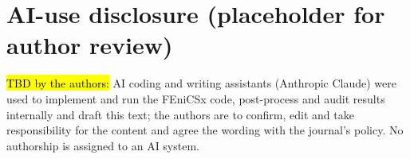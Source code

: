 \documentclass[sn-mathphys,Numbered]{sn-jnl}
\begin{document}
\section*{AI-use disclosure (placeholder for author review)}
{\small\hl{TBD by the authors:} AI coding and writing assistants (Anthropic Claude) were used to implement and run the FEniCSx code, post-process and audit results internally and draft this text; the authors are to confirm, edit and take responsibility for the content and agree the wording with the journal's policy. No authorship is assigned to an AI system.}

{\small}
\end{document}
